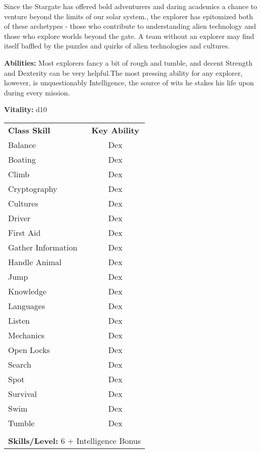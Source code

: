 \begin{multicols}{2}

Since the Stargate has offered bold adventurers and daring academics a chance to venture beyond the limits of our solar system., the explorer has epitomized both of these archetypes - those who contribute to understanding alien technology and those who explore worlds beyond the gate. A team without an explorer may find itself baffled by the puzzles and quirks of alien technologies and cultures.

\textbf{Abilities:} Most explorers fancy a bit of rough and tumble, and decent Strength and Dexterity can be very helpful.The most pressing ability for any explorer, however, is unquestionably Intelligence, the source of wits he stakes his life upon during every mission.

\textbf{Vitality:} d10

\end{multicols}

\begin{table}[htb]
\raggedright
\begin{tabular}{l c}
\textbf{Class Skill} & \textbf{Key Ability}\\

Balance & Dex\\
Boating & Dex\\
Climb & Dex\\
Cryptography & Dex\\
Cultures & Dex\\
Driver & Dex\\
First Aid & Dex\\
Gather Information & Dex\\
Handle Animal & Dex\\
Jump & Dex\\
Knowledge & Dex\\
Languages & Dex\\
Listen & Dex\\
Mechanics & Dex\\
Open Locks & Dex\\
Search & Dex\\
Spot & Dex\\
Survival & Dex\\
Swim & Dex\\
Tumble & Dex\\

\multicolumn{2}{l}{\cellcolor{white}}\\
\multicolumn{2}{l}{\cellcolor{white}\textbf{Skills/Level:} 6 + Intelligence Bonus}\\
\end{tabular}
\end{table}

